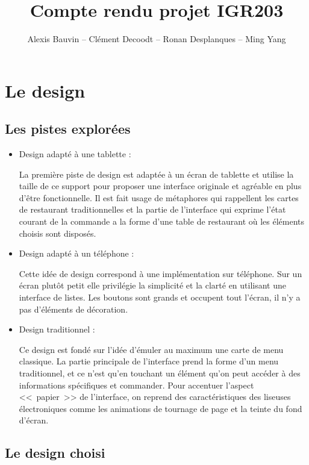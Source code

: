 \documentclass[a4paper,12pt]{article}
\title{Compte rendu projet IGR203}
\author{Alexis Bauvin -- Clément Decoodt -- Ronan Desplanques -- Ming Yang}
\begin{document}
\maketitle

\tableofcontents

\section{Le design}

\subsection{Les pistes explorées}

\begin{itemize}
\item Design adapté à une tablette :

La première piste de design est adaptée à un écran de tablette et utilise la taille de ce support pour proposer
une interface originale et agréable en plus d'être fonctionnelle. Il est fait usage de métaphores qui rappellent
les cartes de restaurant traditionnelles et la partie de l'interface qui exprime l'état courant de la commande
a la forme d'une table de restaurant où les éléments choisis sont disposés.

\item Design adapté à un téléphone :

Cette idée de design correspond à une implémentation sur téléphone. Sur un écran plutôt petit elle privilégie la
simplicité et la clarté en utilisant une interface de listes. Les boutons sont grands et occupent tout l'écran,
il n'y a pas d'éléments de décoration.

\item Design traditionnel :

Ce design est fondé sur l'idée d'émuler au maximum une carte de menu classique. La partie principale de l'interface
prend la forme d'un menu traditionnel, et ce n'est qu'en touchant un élément qu'on peut accéder à des informations
spécifiques et commander. Pour accentuer l'aspect <<~papier~>> de l'interface, on reprend des caractéristiques des
liseuses électroniques comme les animations de tournage de page et la teinte du fond d'écran.

\end{itemize}

\subsection{Le design choisi}
\end{document}
